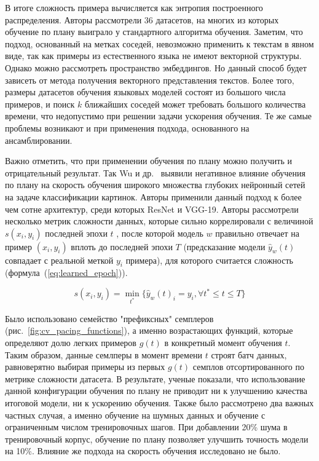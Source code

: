 \documentclass{spbau-diploma}
\begin{document}
В итоге сложность примера вычисляется как энтропия построенного распределения. Авторы рассмотрели $36$ датасетов, на многих из которых обучение по плану выиграло у стандартного алгоритма обучения. Заметим, что подход, основанный на метках соседей, невозможно применить к текстам в явном виде, так как примеры из естественного языка не имеют векторной структуры. Однако можно рассмотреть пространство эмбеддингов. Но данный способ будет зависеть от метода получения векторного представления текстов. Более того, размеры датасетов обучения языковых моделей состоят из большого числа примеров, и поиск $k$ ближайших соседей может требовать большого количества времени, что недопустимо при решении задачи ускорения обучения. Те же самые проблемы возникают и при применения подхода, основанного на ансамблировании.

Важно отметить, что при применении обучения по плану можно получить и отрицательный результат. Так Wu и др.~\cite{wu2020curricula} выявили негативное влияние обучения по плану на скорость обучения широкого множества глубоких нейронный сетей на задаче классификации картинок. Авторы применили данный подход к более чем сотне архитектур, среди которых ResNet и VGG-19. Авторы рассмотрели несколько метрик сложности данных, которые сильно коррелировали с величиной $s(x_i, y_i)$ последней эпохи $t$	, после которой модель $w$ правильно отвечает на пример $(x_i, y_i)$ вплоть до последней эпохи $T$ (предсказание модели $\hat{y}_w(t)$ совпадает с реальной меткой $y_i$ примера), для которого считается сложность (формула~(\ref{eq:learned_epoch})). 

\begin{equation} \label{eq:learned_epoch}
s(x_i, y_i) = \min_{t^*}\{\hat{y}_w(t)_i = y_i,\forall t^* \le t \le T\}
\end{equation}

Было использовано семейство "префиксных" семплеров (рис.~\ref{fig:cv_pacing_functions}), а именно возрастающих функций, которые определяют долю легких примеров $g(t)$ в конкретный момент обучения $t$. Таким образом, данные семлперы в момент времени $t$ строят батч данных, равноверятно выбирая примеры из первых $g(t)$ семплов отсортированного по метрике сложности датасета. В результате, ученые показали, что использование данной конфигурации обучения по плану не приводит ни к улучшению качества итоговой модели, ни к ускорению обучения. Также было рассмотрено два важных частных случая, а именно обучение на шумных данных и обучение с ограниченным числом тренировочных шагов. При добавлении 20\% шума в тренировочный корпус, обучение по плану позволяет улучшить точность модели на 10\%. Влияние же подхода на скорость обучения исследовано не было.
\end{document}
